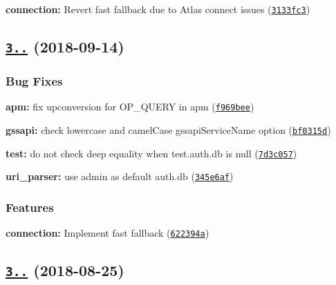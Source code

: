 \begin{DoxyItemize}
\item {\bfseries connection\+:} Revert fast fallback due to Atlas connect issues (\href{https://github.com/mongodb-js/mongodb-core/commit/3133fc3}{\tt 3133fc3})
\end{DoxyItemize}

\label{_3.1.4}%
 \subsection*{\href{https://github.com/mongodb-js/mongodb-core/compare/v3.1.3...v3.1.4}{\tt 3..} (2018-\/09-\/14)}

\subsubsection*{Bug Fixes}


\begin{DoxyItemize}
\item {\bfseries apm\+:} fix upconversion for O\+P\+\_\+\+Q\+U\+E\+RY in apm (\href{https://github.com/mongodb-js/mongodb-core/commit/f969bee}{\tt f969bee})
\item {\bfseries gssapi\+:} check lowercase and camel\+Case gssapi\+Service\+Name option (\href{https://github.com/mongodb-js/mongodb-core/commit/bf0315d}{\tt bf0315d})
\item {\bfseries test\+:} do not check deep equality when test.\+auth.\+db is null (\href{https://github.com/mongodb-js/mongodb-core/commit/7d3c057}{\tt 7d3c057})
\item {\bfseries uri\+\_\+parser\+:} use admin as default auth.\+db (\href{https://github.com/mongodb-js/mongodb-core/commit/345e6af}{\tt 345e6af})
\end{DoxyItemize}

\subsubsection*{Features}


\begin{DoxyItemize}
\item {\bfseries connection\+:} Implement fast fallback (\href{https://github.com/mongodb-js/mongodb-core/commit/622394a}{\tt 622394a})
\end{DoxyItemize}

\label{_3.1.3}%
 \subsection*{\href{https://github.com/mongodb-js/mongodb-core/compare/v3.1.2...v3.1.3}{\tt 3..} (2018-\/08-\/25)}

